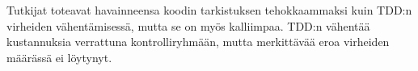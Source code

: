 \documentclass[finnish]{tktltiki2}
\theoremstyle{definition}
\theoremstyle{remark}
\begin{document}
Tutkijat toteavat havainneensa koodin tarkistuksen tehokkaammaksi kuin TDD:n virheiden vähentämisessä, mutta se on myös kalliimpaa. TDD:n vähentää kustannuksia verrattuna kontrolliryhmään, mutta merkittävää eroa virheiden määrässä ei löytynyt.


































%
%
% 
%









% 
\end{document}
